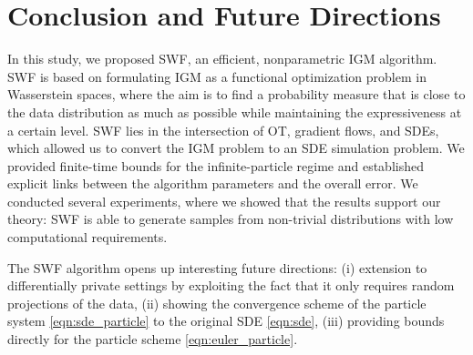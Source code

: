 
\section{Conclusion and Future Directions}

In this study, we proposed SWF, an efficient, nonparametric IGM algorithm.
SWF is based on formulating IGM as a functional optimization problem in Wasserstein spaces, where the aim is to find a probability measure that is close to the data distribution as much as possible while maintaining the expressiveness at a certain level.
SWF lies in the intersection of OT, gradient flows, and SDEs, which allowed us to convert the IGM problem to an SDE simulation problem. We provided finite-time bounds for the infinite-particle regime and established explicit links between the algorithm parameters and the overall error.
%
We conducted several experiments, where we showed that the results support our theory: SWF is able to generate samples from non-trivial distributions with low computational requirements.

The SWF algorithm opens up interesting future directions: (i) extension to differentially private settings \cite{dwork2014algorithmic} by exploiting the fact that it only requires random projections of the data, (ii) showing the convergence scheme of the particle system \eqref{eqn:sde_particle} to the original SDE \eqref{eqn:sde}, (iii) providing bounds directly for the particle scheme \eqref{eqn:euler_particle}.
